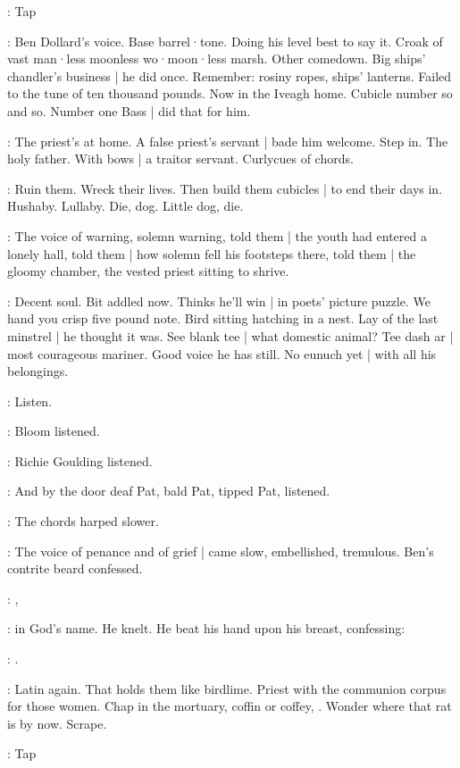 \stripling:
Tap

\BloomInt:
Ben Dollard's voice.
Base barrel·tone.
Doing his level best to say it.
Croak of vast man·less moonless wo·moon·less marsh.
Other comedown.
Big ships' chandler's business |
he did once.
Remember:
rosiny ropes,
ships' lanterns.
Failed to the tune of ten thousand pounds.
Now in the Iveagh home.
Cubicle number so and so.
Number one Bass |
did that for him.

:
The priest's at home.
A false priest's servant |
bade him welcome.
Step in.
The holy father.
With bows |
a traitor servant.
Curlycues of chords.

\BloomInt:
Ruin them.
Wreck their lives.
Then build them cubicles |
to end their days in.
Hushaby.
Lullaby.
Die,
dog.
Little dog,
die.

:
The voice of warning,
solemn warning,
told them |
the youth had entered a lonely hall,
told them |
how solemn fell his footsteps there,
told them |
the gloomy chamber,
the vested priest sitting to shrive.

\BloomInt:
Decent soul.
Bit addled now.
Thinks he'll win |
in  poets' picture puzzle.
We hand you crisp five pound note.
Bird sitting hatching in a nest.
Lay of the last minstrel |
he thought it was.
See blank tee |
what domestic animal?
Tee dash ar |
most courageous mariner.
Good voice he has still.
No eunuch yet |
with all his belongings.

\BloomInt:
Listen.

:
Bloom listened.

:
Richie Goulding listened.

:
And by the door
deaf Pat,
bald Pat,
tipped Pat,
listened.

:
The chords harped slower.

:
The voice of penance and of grief |
came slow,
embellished,
tremulous.
Ben's contrite beard confessed.

\dollard:
,

:
in God's name.
He knelt.
He beat his hand upon his breast,
confessing:

\dollard:
.

\BloomInt:
Latin again.
That holds them like birdlime.
Priest with the communion corpus for those women.
Chap in the mortuary,
coffin or coffey,
.
Wonder where that rat is by now.
Scrape.

\stripling:
Tap

